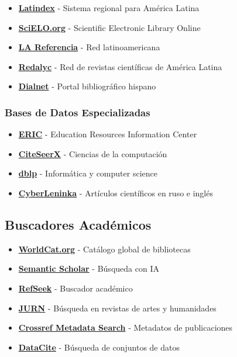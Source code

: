 \documentclass[
  jou,
  floatsintext,
  longtable,
  a4paper,
  nolmodern,
  notxfonts,
  notimes,
  12pt,
  colorlinks=true,linkcolor=blue,citecolor=blue,urlcolor=blue]{apa7}
\providecommand{\tightlist}{%
  \setlength{\itemsep}{0pt}\setlength{\parskip}{0pt}}
\begin{document}
\begin{itemize}
\tightlist
\item
  \textbf{\href{https://www.latindex.org/}{Latindex}} - Sistema regional
  para América Latina
\item
  \textbf{\href{https://www.scielo.org/}{SciELO.org}} - Scientific
  Electronic Library Online
\item
  \textbf{\href{https://www.lareferencia.info/es/}{LA Referencia}} - Red
  latinoamericana
\item
  \textbf{\href{https://www.redalyc.org/}{Redalyc}} - Red de revistas
  científicas de América Latina
\item
  \textbf{\href{https://dialnet.unirioja.es/}{Dialnet}} - Portal
  bibliográfico hispano
\end{itemize}

\subsubsection{Bases de Datos
Especializadas}\label{bases-de-datos-especializadas}

\begin{itemize}
\tightlist
\item
  \textbf{\href{https://eric.ed.gov/}{ERIC}} - Education Resources
  Information Center
\item
  \textbf{\href{https://citeseerx.ist.psu.edu/}{CiteSeerX}} - Ciencias
  de la computación
\item
  \textbf{\href{https://dblp.uni-trier.de/}{dblp}} - Informática y
  computer science
\item
  \textbf{\href{https://cyberleninka.org/}{CyberLeninka}} - Artículos
  científicos en ruso e inglés
\end{itemize}

\subsection{Buscadores Académicos}\label{buscadores-acaduxe9micos}

\begin{itemize}
\tightlist
\item
  \textbf{\href{https://search.worldcat.org/es}{WorldCat.org}} -
  Catálogo global de bibliotecas
\item
  \textbf{\href{https://www.semanticscholar.org/}{Semantic Scholar}} -
  Búsqueda con IA
\item
  \textbf{\href{https://www.refseek.com/}{RefSeek}} - Buscador académico
\item
  \textbf{\href{https://jurn.org/}{JURN}} - Búsqueda en revistas de
  artes y humanidades
\item
  \textbf{\href{https://search.crossref.org/}{Crossref Metadata Search}}
  - Metadatos de publicaciones
\item
  \textbf{\href{https://datacite.org/}{DataCite}} - Búsqueda de
  conjuntos de datos
\end{itemize}
\end{document}
